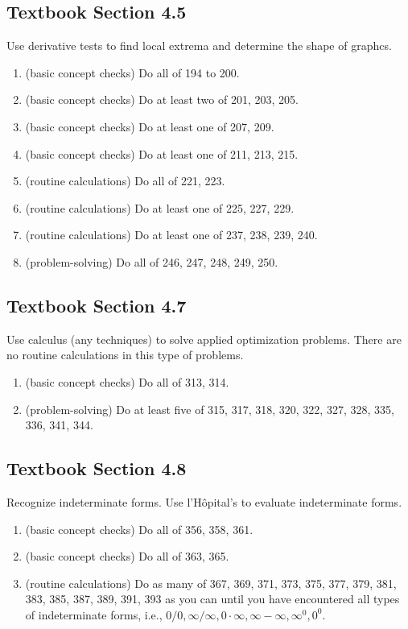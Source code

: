 \documentclass[../main.tex]{subfiles}
\begin{document}
\subsection*{Textbook Section 4.5}

Use derivative tests to find local extrema and determine the shape of graphcs.
\begin{enumerate}
  \item (basic concept checks) Do all of 194 to 200.
  \item (basic concept checks) Do at least two of 201, 203, 205.
  \item (basic concept checks) Do at least one of 207, 209.
  \item (basic concept checks) Do at least one of 211, 213, 215.
  \item (routine calculations) Do all of 221, 223.
  \item (routine calculations) Do at least one of 225, 227, 229.
  \item (routine calculations) Do at least one of 237, 238, 239, 240.
  \item (problem-solving) Do all of 246, 247, 248, 249, 250.
\end{enumerate}

\clearpage
\subsection*{Textbook Section 4.7}

Use calculus (any techniques) to solve applied optimization problems.  There are no routine calculations in this type of problems.
\begin{enumerate}
  \item (basic concept checks) Do all of 313, 314.
  \item (problem-solving) Do at least five of 315, 317, 318, 320, 322, 327, 328, 335, 336, 341, 344.
\end{enumerate}

\subsection*{Textbook Section 4.8}

Recognize indeterminate forms. Use l'H\^opital's to evaluate indeterminate forms.
\begin{enumerate}
  \item (basic concept checks) Do all of 356, 358, 361.
  \item (basic concept checks) Do all of 363, 365.
  \item (routine calculations) Do as many of 367, 369, 371, 373, 375, 377, 379, 381, 383, 385, 387, 389, 391, 393 as you can until you have encountered all types of indeterminate forms, i.e., \(0/0, \infty/\infty, 0 \cdot \infty, \infty - \infty, \infty^{0}, 0^{0}\).
\end{enumerate}
\end{document}
